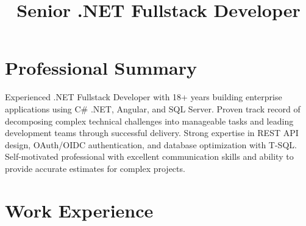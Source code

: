 \documentclass[11pt,a4paper,sans]{moderncv}
\title{Senior .NET Fullstack Developer}
\begin{document}
\makecvtitle

\section*{Professional Summary}
Experienced .NET Fullstack Developer with 18+ years building enterprise applications using C\# .NET, Angular, and SQL Server. Proven track record of decomposing complex technical challenges into manageable tasks and leading development teams through successful delivery. Strong expertise in REST API design, OAuth/OIDC authentication, and database optimization with T-SQL. Self-motivated professional with excellent communication skills and ability to provide accurate estimates for complex projects.

\section*{Work Experience}
\end{document}
